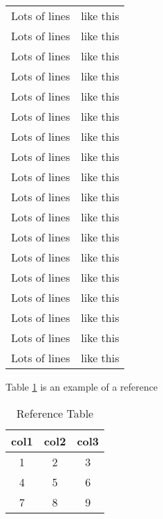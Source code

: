 \documentclass{report}
\begin{document}
\begin{longtable}[c]{| c | c |}
 Lots of lines & like this\\
 Lots of lines & like this\\
 Lots of lines & like this\\
 Lots of lines & like this\\
 Lots of lines & like this\\
 Lots of lines & like this\\
 Lots of lines & like this\\
 Lots of lines & like this\\
 Lots of lines & like this\\
 Lots of lines & like this\\
 Lots of lines & like this\\
 Lots of lines & like this\\
 Lots of lines & like this\\
 Lots of lines & like this\\
 Lots of lines & like this\\
 Lots of lines & like this\\
 Lots of lines & like this\\
 Lots of lines & like this\\
 \end{longtable}
\listoftables
\vspace{10 pt}
Table \ref{tab:my_label} is an example of a reference
\begin{table}[h!]
    \centering
    \begin{tabular}{|c|c|c|}
        \hline
        col1 & col2 & col3  \\
        \hline
        1 & 2 & 3 \\
        4 & 5 & 6 \\
        7 & 8 & 9 \\
        \hline
    \end{tabular}
    \caption{Reference Table}
    \label{tab:my_label}
\end{table}

\end{document}
